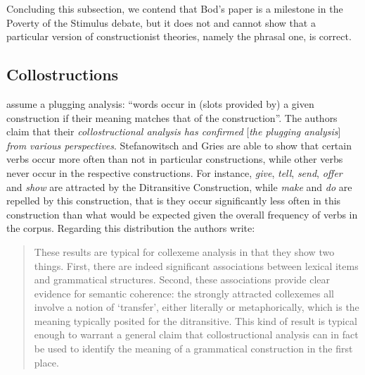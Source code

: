 \begin{exe}
\begin{xlist}[iv.]
\begin{exe}
\begin{xlist}[iv.]
Concluding this subsection, we contend that Bod's paper is a milestone in the Poverty of the
Stimulus debate, but it does not and cannot show that a particular version of constructionist
theories, namely the phrasal one, is correct.


\subsection{Collostructions}

\mbox{}\citet[Section~5]{SG2009a} assume a plugging analysis: ``words
  occur in (slots provided by) a given   construction if their meaning matches that of the
  construction''. The authors claim that their \emph{collostructional analysis has confirmed}
  [\emph{the plugging analysis}] \emph{from various perspectives}. Stefanowitsch and Gries are able to show that certain verbs occur more often
than not in particular constructions, while other verbs never occur in the respective
constructions. For instance, \emph{give}, \emph{tell}, \emph{send}, \emph{offer} and \emph{show} are
attracted by the Ditransitive Construction, while \emph{make} and \emph{do} are repelled by this
construction, that is they occur significantly less often in this construction than what would be
expected given the overall frequency of verbs in the corpus. Regarding this distribution the authors write:
\begin{quote}
  These results are typical for collexeme analysis in that they show two things. First, there are
  indeed significant associations between lexical items and grammatical structures. Second, these
  associations provide clear evidence for semantic coherence: the strongly attracted collexemes all
  involve a notion of `transfer', either literally or metaphorically, which is the meaning typically
  posited for the ditransitive. This kind of result is typical enough to warrant a general claim
  that collostructional analysis can in fact be used to identify the meaning of a grammatical
  construction in the first place. \citep[]{SG2009a}
\end{quote}


\end{xlist}
\end{exe}
\end{xlist}
\end{exe}
